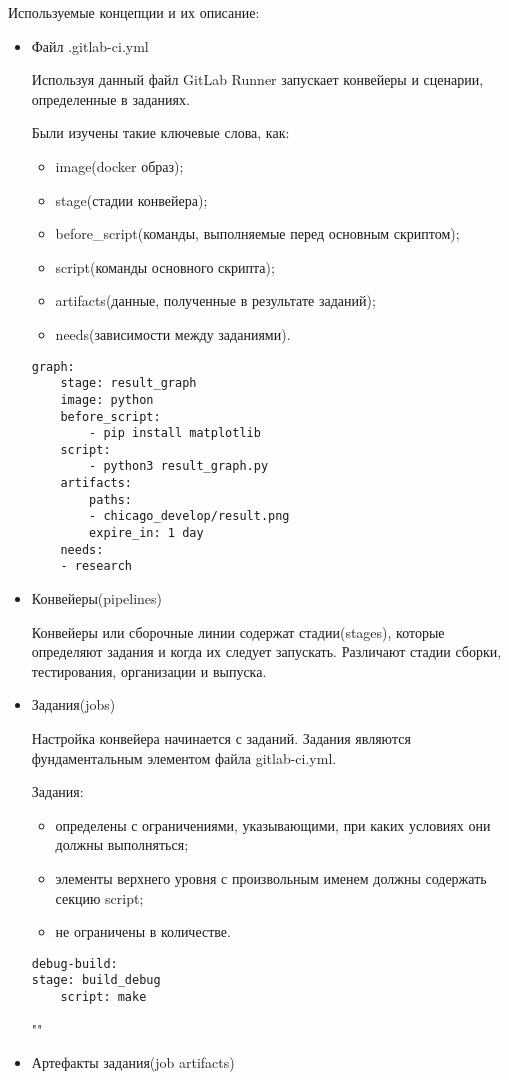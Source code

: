 Используемые концепции и их описание:
\begin{itemize}
	\item Файл .gitlab-ci.yml
	
		Используя данный файл GitLab Runner запускает конвейеры и сценарии, определенные в заданиях.
		
		Были изучены такие ключевые слова, как:
		\begin{itemize}
			\item image(docker образ);
			\item stage(стадии конвейера);
			\item before\_script(команды, выполняемые перед основным скриптом);
			\item script(команды основного скрипта);
			\item artifacts(данные, полученные в результате заданий);
			\item needs(зависимости между заданиями).
		\end{itemize}
		
		\begin{lstlisting}[caption={Пример файла .gitlab-ci.yml}]
graph:
	stage: result_graph
	image: python
	before_script:
		- pip install matplotlib
	script:
		- python3 result_graph.py
	artifacts:
		paths:
		- chicago_develop/result.png
		expire_in: 1 day
	needs:
	- research
		\end{lstlisting}		
	\item Конвейеры(pipelines)
	
	Конвейеры или сборочные линии содержат стадии(stages), которые определяют задания и когда их следует запускать. Различают стадии сборки, тестирования, организации и выпуска.
	
	\item Задания(jobs)
	
	Настройка конвейера начинается с заданий. Задания являются фундаментальным элементом файла gitlab-ci.yml.
	
	Задания:
	\begin{itemize}
	    \item определены с ограничениями, указывающими, при каких условиях они должны выполняться;
		\item элементы верхнего уровня с произвольным именем должны содержать секцию script;
		\item не ограничены в количестве.
	\end{itemize}

	\begin{lstlisting}[caption={Пример задания}]
debug-build:
stage: build_debug
	script: make
	\end{lstlisting}	
	""\newline
	\item Артефакты задания(job artifacts)
	

\end{itemize}
